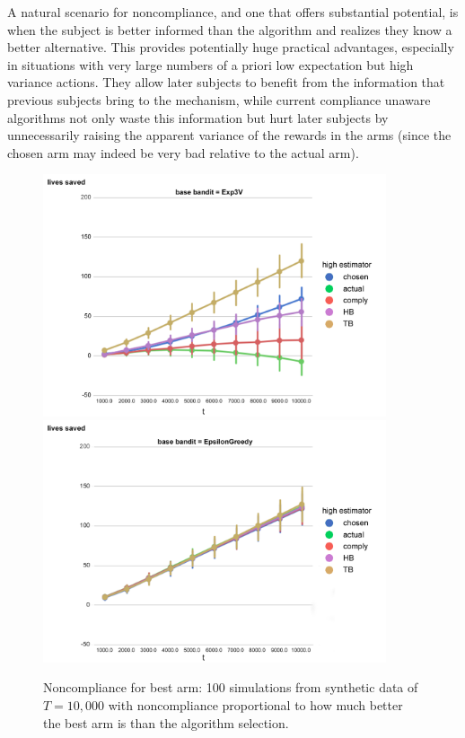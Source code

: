 A natural scenario for noncompliance, and one that offers substantial potential, is when the subject is better informed than the algorithm and realizes they know a better alternative. 
This provides potentially huge practical advantages, especially in situations with very large numbers of a priori low expectation but high variance actions. 
They allow later subjects to benefit from the information that previous subjects bring to the mechanism, while current compliance unaware algorithms not only waste this information but hurt later subjects by unnecessarily raising the apparent variance of the rewards in the arms (since the chosen arm may indeed be very bad relative to the actual arm).



\begin{figure}[t]
	\centering	
	\includegraphics[width=0.9\textwidth]{bandit/figs/ex4-1.jpg}\hspace{1cm}	\includegraphics[width=0.9\textwidth]{bandit/figs/ex4-2.jpg}\hspace{1cm}
	\caption{Noncompliance for best arm: 100 simulations from synthetic data of $T=10,000$ with noncompliance proportional to how much better the best arm is than the algorithm selection.}
\end{figure}	
